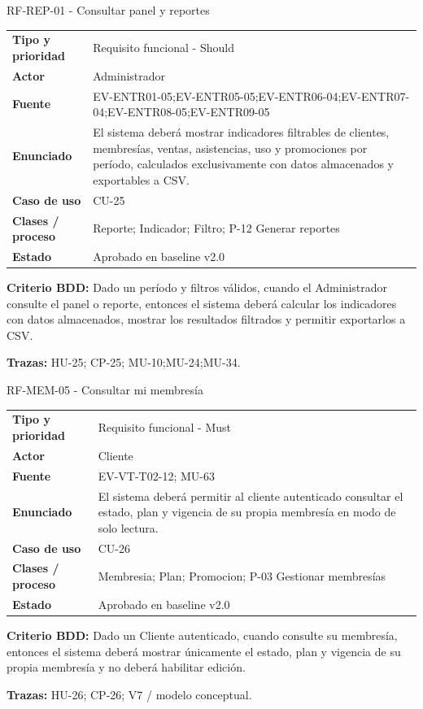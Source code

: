 \begin{reqbox}{RF-REP-01 - Consultar panel y reportes}
\begin{tabularx}{\textwidth}{>{\bfseries}p{3.2cm}Y}
Tipo y prioridad & Requisito funcional - Should \\
Actor & Administrador \\
Fuente & EV-ENTR01-05;EV-ENTR05-05;EV-ENTR06-04;EV-ENTR07-04;EV-ENTR08-05;EV-ENTR09-05 \\
Enunciado & El sistema deberá mostrar indicadores filtrables de clientes, membresías, ventas, asistencias, uso y promociones por período, calculados exclusivamente con datos almacenados y exportables a CSV. \\
Caso de uso & CU-25 \\
Clases / proceso & Reporte; Indicador; Filtro; P-12 Generar reportes \\
Estado & Aprobado en baseline v2.0 \\
\end{tabularx}
\textbf{Criterio BDD:} Dado un período y filtros válidos, cuando el Administrador consulte el panel o reporte, entonces el sistema deberá calcular los indicadores con datos almacenados, mostrar los resultados filtrados y permitir exportarlos a CSV.

\textbf{Trazas:} HU-25; CP-25; MU-10;MU-24;MU-34.
\end{reqbox}


\begin{reqbox}{RF-MEM-05 - Consultar mi membresía}
\begin{tabularx}{\textwidth}{>{\bfseries}p{3.2cm}Y}
Tipo y prioridad & Requisito funcional - Must \\
Actor & Cliente \\
Fuente & EV-VT-T02-12; MU-63 \\
Enunciado & El sistema deberá permitir al cliente autenticado consultar el estado, plan y vigencia de su propia membresía en modo de solo lectura. \\
Caso de uso & CU-26 \\
Clases / proceso & Membresia; Plan; Promocion; P-03 Gestionar membresías \\
Estado & Aprobado en baseline v2.0 \\
\end{tabularx}
\textbf{Criterio BDD:} Dado un Cliente autenticado, cuando consulte su membresía, entonces el sistema deberá mostrar únicamente el estado, plan y vigencia de su propia membresía y no deberá habilitar edición.

\textbf{Trazas:} HU-26; CP-26; V7 / modelo conceptual.
\end{reqbox}


